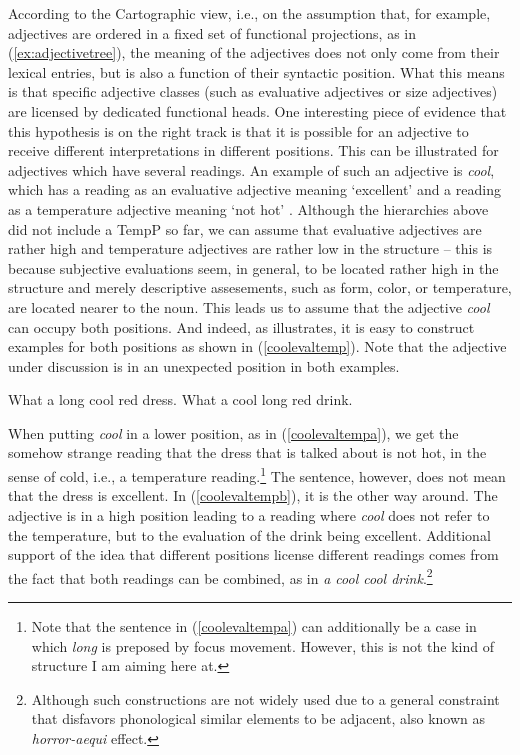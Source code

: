 \noindent According to the Cartographic view, i.e., on the assumption that, for example, adjectives are ordered in a fixed set of functional projections, as in (\ref{ex:adjectivetree}), the meaning of the adjectives does not only come from their lexical entries, but is also a function of their syntactic position. What this means is that specific adjective classes (such as evaluative adjectives or size adjectives) are licensed by dedicated functional heads. One interesting piece of evidence that this hypothesis is on the right track is that it is possible for an adjective to receive different interpretations in different positions. This can be illustrated for adjectives which have several readings. An example of such an adjective is \textit{cool}, which has a reading as an evaluative adjective meaning `excellent' and a reading as a temperature adjective meaning `not hot' \citep{scott2002stacked}. Although the hierarchies above did not include a TempP so far, we can assume that evaluative adjectives are rather high and temperature adjectives are rather low in the structure -- this is because subjective evaluations seem, in general, to be located rather high in the structure and merely descriptive assesements, such as form, color, or temperature, are located nearer to the noun. This leads us to assume that the adjective \textit{cool} can occupy both positions. And indeed, as \citet[106]{scott2002stacked} illustrates, it is easy to construct examples for both positions as shown in (\ref{coolevaltemp}). Note that the adjective under discussion is in an unexpected position in both examples. 

\begin{exe}
\ex\label{coolevaltemp}\begin{xlist} 
\ex What a long cool red dress. \label{coolevaltempa}
\ex What a cool long red drink. \label{coolevaltempb}
\end{xlist}
\end{exe}

\noindent When putting \textit{cool} in a lower position, as in (\ref{coolevaltempa}), we get the somehow strange reading that the dress that is talked about is not hot, in the sense of cold, i.e., a temperature reading.\footnote{ Note that the sentence in (\ref{coolevaltempa}) can additionally be a case in which \textit{long} is preposed by focus movement. However, this is not the kind of structure I am aiming here at.} The sentence, however, does not mean that the dress is excellent. In (\ref{coolevaltempb}), it is the other way around. The adjective is in a high position leading to a reading where \textit{cool} does not refer to the temperature, but to the evaluation of the drink being excellent. Additional support of the idea that different positions license different readings comes from the fact that both readings can be combined, as in \textit{a cool cool drink}.\footnote{ Although such constructions are not widely used due to a general constraint that disfavors phonological similar elements to be adjacent, also known as \textit{horror-aequi} effect.}

